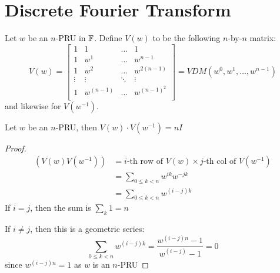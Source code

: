 
\section{Discrete Fourier Transform}

\begin{definition}{}{}
    Let $w$ be an $n$-PRU in $\operatorname{\mathbb{F}}$.
    Define $V(w)$ to be the following $n$-by-$n$ matrix:
    \begin{equation}
        V(w) = 
        \begin{bmatrix}
            1 & 1 & \ldots & 1 \\    
            1 & w^1 & \ldots & w^{n-1} \\    
            1 & w^2 & \ldots & w^{2(n-1)} \\    
            \vdots & \vdots & \ddots & \vdots \\    
            1 & w^{(n-1)} & \ldots & w^{(n-1)^2} \\    
        \end{bmatrix}
        =
        VDM(w^0, w^1, \ldots, w^{n-1})
    \end{equation}
    and likewise for $V(w^{-1})$.
\end{definition}

\begin{theorem}{}{}
    Let $w$ be an $n$-PRU, then $V(w)\cdot V(w^{-1}) = nI$
\end{theorem}
\begin{proof}
    \begin{align*}
        \left(V(w)V(w^{-1})\right) &= i\text{-th row of }V(w) \times j\text{-th col of }V(w^{-1}) \\
        &= \sum_{0 \leq k < n} w^{ik}w^{-jk} \\ 
        &= \sum_{0 \leq k < n} w^{(i - j)k}
    \end{align*}
    If $i = j$, then the sum is $\sum_k 1 = n$

    If $i \neq j$, then this is a geometric series:
    \begin{equation*}
        \sum_{0 \leq k < n} w^{(i - j)k} = \frac{w^{(i-j)n} - 1}{w^{(i - j)} - 1} = 0
    \end{equation*}
    since $w^{(i - j)n} = 1$ as $w$ is an $n$-PRU
\end{proof}

